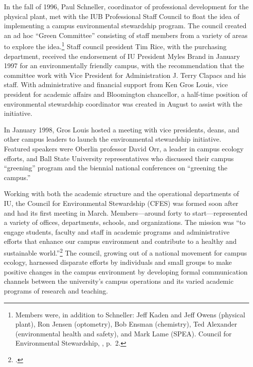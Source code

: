\documentclass[
  american,
  letterpaper,
]{scrreprt}
\begin{document}
In the fall of 1996, Paul Schneller, coordinator of professional
development for the physical plant, met with the IUB Professional Staff
Council to float the idea of implementing a campus environmental
stewardship program. The council created an ad hoc ``Green Committee''
consisting of staff members from a variety of areas to explore the
idea.\footnote{Members were, in addition to Schneller: Jeff Kaden and
  Jeff Owens (physical plant), Ron Jensen (optometry), Bob Ensman
  (chemistry), Ted Alexander (environmental health and safety), and Mark
  Lame (SPEA). Council for Environmental Stewardship,
  , p.~2.} Staff
council president Tim Rice, with the purchasing department, received the
endorsement of IU President Myles Brand in January 1997 for an
environmentally friendly campus, with the recommendation that the
committee work with Vice President for Administration J. Terry Clapacs
and his staff. With administrative and financial support from Ken Gros
Louis, vice president for academic affairs and Bloomington chancellor, a
half-time position of environmental stewardship coordinator was created
in August to assist with the initiative.

In January 1998, Gros Louis hosted a meeting with vice presidents,
deans, and other campus leaders to launch the environmental stewardship
initiative. Featured speakers were Oberlin professor David Orr, a leader
in campus ecology efforts, and Ball State University representatives who
discussed their campus ``greening'' program and the biennial national
conferences on ``greening the campus.''

Working with both the academic structure and the operational departments
of IU, the Council for Environmental Stewardship (CFES) was formed soon
after and had its first meeting in March. Members---around forty to
start---represented a variety of offices, departments, schools, and
organizations. The mission was ``to engage students, faculty and staff
in academic programs and administrative efforts that enhance our campus
environment and contribute to a healthy and sustainable
world.''\footnote{.} The council, growing out of a national movement for
campus ecology, harnessed disparate efforts by individuals and small
groups to make positive changes in the campus environment by developing
formal communication channels between the university's campus operations
and its varied academic programs of research and teaching.
\end{document}
